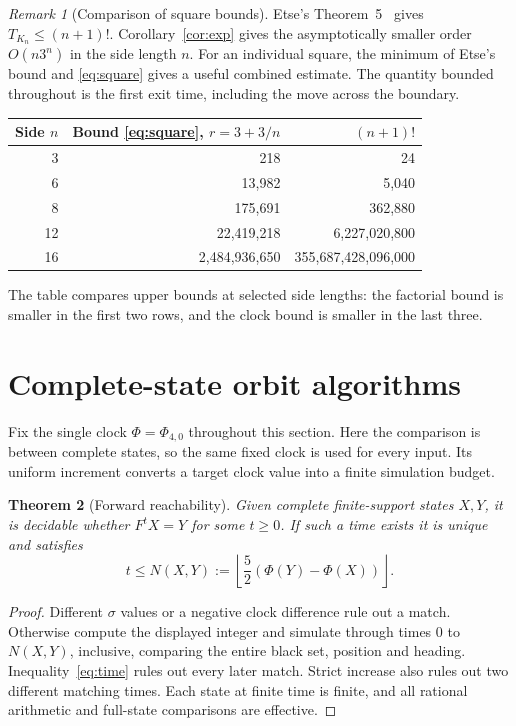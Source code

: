 \documentclass[11pt,a4paper]{article}
\newtheorem{theorem}{Theorem}[section]
\theoremstyle{remark}\newtheorem{remark}[theorem]{Remark}
\begin{document}
\begin{remark}[Comparison of square bounds]
Etse's Theorem~5~\cite{Etse2026} gives $T_{K_n}\le(n+1)!$. Corollary~\ref{cor:exp}
gives the asymptotically smaller order $O(n3^n)$ in the side length $n$.
For an individual square, the minimum of Etse's bound and
\eqref{eq:square} gives a useful combined estimate. The quantity bounded
throughout is the first exit time, including the move across the boundary.
\end{remark}

\begin{center}
\begin{tabular}{r r r}
\toprule
Side $n$ & Bound \eqref{eq:square}, $r=3+3/n$ & $(n+1)!$\\
\midrule
3 & 218 & 24\\
6 & 13,982 & 5,040\\
8 & 175,691 & 362,880\\
12 & 22,419,218 & 6,227,020,800\\
16 & 2,484,936,650 & 355,687,428,096,000\\
\bottomrule
\end{tabular}
\end{center}
The table compares upper bounds at selected side lengths: the factorial bound
is smaller in the first two rows, and the clock bound is smaller in the last three.

\section{Complete-state orbit algorithms}
Fix the single clock $\Phi=\Phi_{4,0}$ throughout this section.
Here the comparison is between complete states, so the same fixed clock is
used for every input. Its uniform increment converts a target clock value
into a finite simulation budget.

\begin{theorem}[Forward reachability]\label{thm:reach}
Given complete finite-support states $X,Y$, it is decidable whether
$F^tX=Y$ for some $t\ge0$. If such a time exists it is unique and satisfies
\[
 t\le N(X,Y):=\left\lfloor\frac52(\Phi(Y)-\Phi(X))\right\rfloor.
\]
\end{theorem}
\begin{proof}
Different $\sigma$ values or a negative clock difference rule out a match.
Otherwise compute the displayed integer and simulate through times $0$ to
$N(X,Y)$, inclusive, comparing the entire black set, position and heading.
Inequality~\eqref{eq:time} rules out every later match. Strict increase also
rules out two different matching times. Each state at finite time is finite,
and all rational arithmetic and full-state comparisons are effective.
\end{proof}
\end{document}
